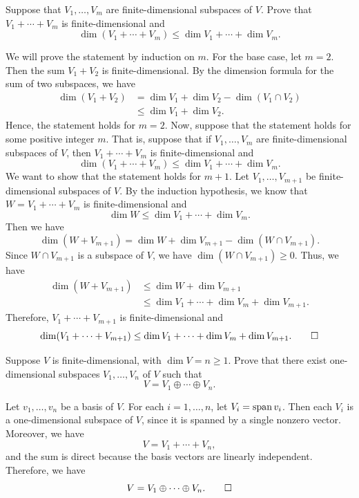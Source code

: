 \begin{exc}
\begin{exercise}
Suppose that $V_1,\dots,V_m$ are finite-dimensional subspaces of $V$. Prove that
$V_1+\cdots+V_m$ is finite-dimensional and
\[ \dim(V_1+\cdots+V_m) \le \dim V_1+\cdots+\dim V_m. \]
\end{exercise}
\begin{solution}
We will prove the statement by induction on $m$. For the base case, let $m=2$.
Then the sum $V_1+V_2$ is finite-dimensional. By the dimension formula for the
sum of two subspaces, we have
\begin{align*}
\dim(V_1+V_2) &= \dim V_1+\dim V_2-\dim(V_1\cap V_2)\\
  &\le \dim V_1+\dim V_2.
\end{align*}
Hence, the statement holds for $m=2$. Now, suppose that the statement holds for
some positive integer $m$. That is, suppose that if $V_1,\dots,V_m$ are
finite-dimensional subspaces of $V$, then $V_1+\cdots+V_m$ is finite-dimensional
and
\[ \dim(V_1+\cdots+V_m) \le \dim V_1+\cdots+\dim V_m. \]
We want to show that the statement holds for $m+1$. Let $V_1,\dots,V_{m+1}$ be
finite-dimensional subspaces of $V$. By the induction hypothesis, we know that
$W=V_1+\cdots+V_m$ is finite-dimensional and
\[ \dim W \le \dim V_1+\cdots+\dim V_m. \]
Then we have
\[ \dim(W+V_{m+1}) = \dim W+\dim V_{m+1}-\dim(W\cap V_{m+1}). \]
Since $W\cap V_{m+1}$ is a subspace of $V$, we have $\dim(W\cap V_{m+1})\ge0$.
Thus, we have
\begin{align*}
\dim(W+V_{m+1}) &\le \dim W+\dim V_{m+1}\\
  &\le \dim V_1+\cdots+\dim V_m+\dim V_{m+1}.
\end{align*}
Therefore, $V_1+\cdots+V_{m+1}$ is finite-dimensional and
\[ \dim(V_1+\cdots+V_{m+1}) \le \dim V_1+\cdots+\dim V_m+\dim V_{m+1}.
   \qedhere \]
\end{solution}

\begin{exercise}
Suppose $V$ is finite-dimensional, with $\dim V=n\ge1$. Prove that there exist
one-dimensional subspaces $V_1,\dots,V_n$ of $V$ such that
\[ V = V_1\oplus\cdots\oplus V_n. \]
\end{exercise}
\begin{solution}
Let $v_1,\dots,v_n$ be a basis of $V$. For each $i=1,\dots,n$, let
$V_i=\spn v_i$. Then each $V_i$ is a one-dimensional subspace of $V$, since it
is spanned by a single nonzero vector. Moreover, we have
\[ V = V_1+\cdots+V_n, \]
and the sum is direct because the basis vectors are linearly independent.
Therefore, we have
\[ V = V_1\oplus\cdots\oplus V_n. \qedhere \]
\end{solution}


\end{exc}
